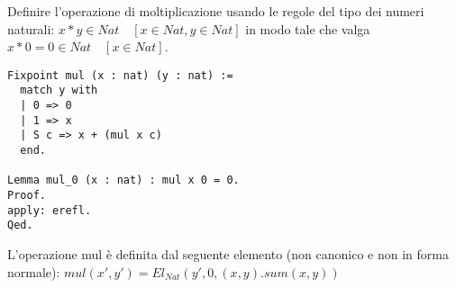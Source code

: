Definire l'operazione di moltiplicazione usando le regole del tipo dei numeri 
naturali: $x*y \in Nat \quad [x \in Nat, y \in Nat]$
in modo tale che valga $x*0 = 0 \in Nat \quad [x \in Nat]$.

\begin{lstlisting}[language=Coq]
Fixpoint mul (x : nat) (y : nat) :=
  match y with
  | 0 => 0
  | 1 => x
  | S c => x + (mul x c)
  end.

Lemma mul_0 (x : nat) : mul x 0 = 0.
Proof.
apply: erefl.
Qed.
\end{lstlisting}

L'operazione mul è definita dal seguente elemento (non canonico e non in
forma normale): $mul(x',y') = El_{Nat}(y',0,(x,y).sum(x,y))$
